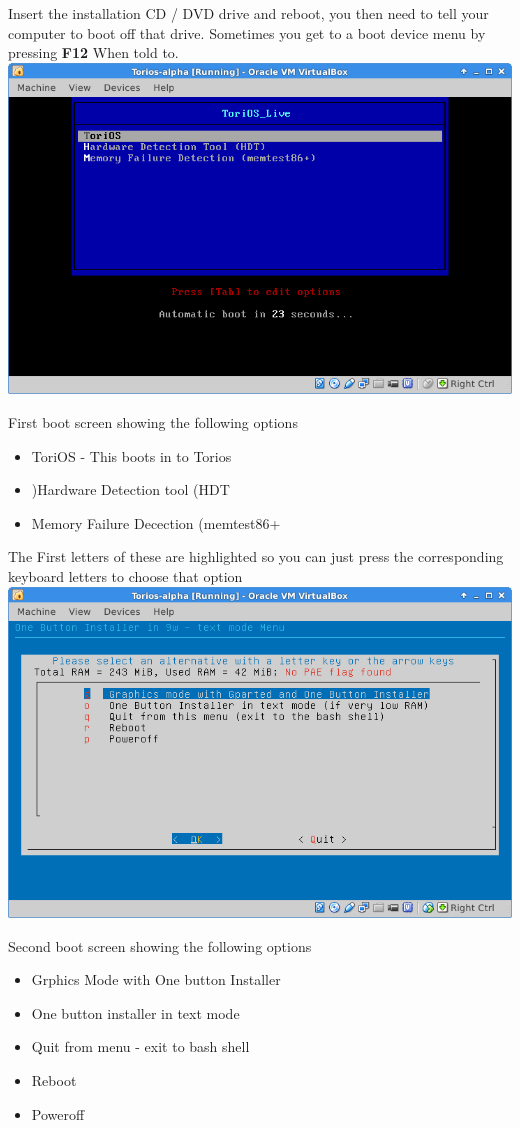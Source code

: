 \documentclass[12pt,a4paper]{book}
\begin{document}
Insert the installation CD / DVD drive and reboot, you then need to tell your computer to boot off that drive.  Sometimes you get to a boot device menu by pressing \textbf{F12} When told to.  \\

\includegraphics[width=0.7\linewidth]{boot-screen1}

First boot screen showing the following options \\

\begin{itemize}
\item{ToriOS - This boots in to Torios} 
\item){Hardware Detection tool (HDT}
\item{Memory Failure Decection (memtest86+}
\end{itemize}


The First letters of these are highlighted so you can just press the corresponding keyboard letters to choose that option \\

\includegraphics[width=0.7\linewidth]{boot-screen2}

Second boot screen showing the following options

\begin{itemize}
\item{Grphics Mode with One button Installer}
\item {One button installer in text mode}
\item{Quit from menu - exit to bash shell}
\item{Reboot}
\item{Poweroff}
\end{itemize}
\end{document}
